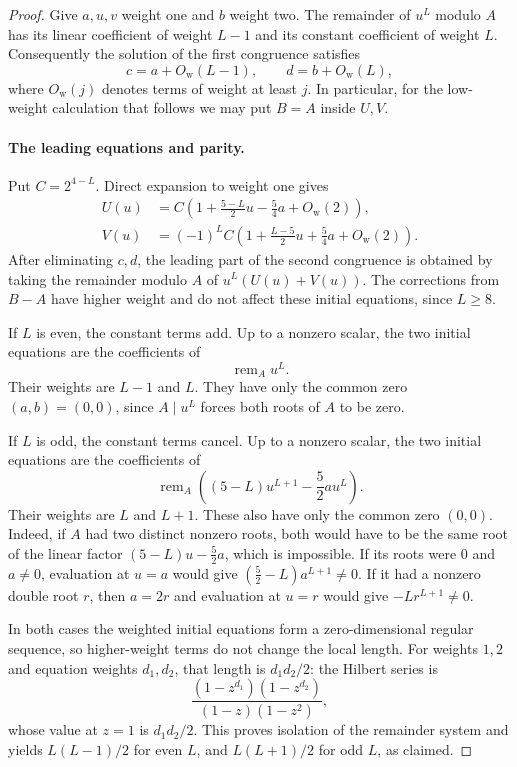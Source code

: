 \documentclass[11pt]{article}
\theoremstyle{definition}
\begin{document}
\begin{proof}
Give $a,u,v$ weight one and $b$ weight two. The remainder of $u^L$
modulo $A$ has its linear coefficient of weight $L-1$ and its constant
coefficient of weight $L$. Consequently the solution of the first
congruence satisfies
\[
 c=a+O_{\mathrm w}(L-1),\qquad d=b+O_{\mathrm w}(L),
\]
where $O_{\mathrm w}(j)$ denotes terms of weight at least $j$.
In particular, for the low-weight calculation that follows we may put
$B=A$ inside $U,V$.

\paragraph{The leading equations and parity.}
Put $C=2^{4-L}$. Direct expansion to weight one gives
\[
 \begin{aligned}
 U(u)&=C\left(1+\frac{5-L}{2}u-\frac54a+O_{\mathrm w}(2)\right),\\
 V(u)&=(-1)^LC\left(1+\frac{L-5}{2}u+\frac54a
                    +O_{\mathrm w}(2)\right).
 \end{aligned}
\]
After eliminating $c,d$, the leading part of the second congruence is
obtained by taking the remainder modulo $A$ of $u^L(U(u)+V(u))$.
The corrections from $B-A$ have higher weight and do not affect these
initial equations, since $L\ge8$.

If $L$ is even, the constant terms add. Up to a nonzero scalar, the
two initial equations are the coefficients of
\[
 \operatorname{rem}_A u^L.
\]
Their weights are $L-1$ and $L$. They have only the common zero
$(a,b)=(0,0)$, since $A\mid u^L$ forces both roots of $A$ to be zero.

If $L$ is odd, the constant terms cancel. Up to a nonzero scalar, the
two initial equations are the coefficients of
\[
 \operatorname{rem}_A\left((5-L)u^{L+1}-\frac52a u^L\right).
\]
Their weights are $L$ and $L+1$. These also have only the common zero
$(0,0)$. Indeed, if $A$ had two distinct nonzero roots, both would have
to be the same root of the linear factor
$(5-L)u-\tfrac52a$, which is impossible. If its roots were $0$ and
$a\ne0$, evaluation at $u=a$ would give
$(\tfrac52-L)a^{L+1}\ne0$. If it had a nonzero double root $r$, then
$a=2r$ and evaluation at $u=r$ would give $-Lr^{L+1}\ne0$.

In both cases the weighted initial equations form a zero-dimensional
regular sequence, so higher-weight terms do not change the local length.
For weights $1,2$ and equation weights $d_1,d_2$, that length is
$d_1d_2/2$: the Hilbert series is
\[
 \frac{(1-z^{d_1})(1-z^{d_2})}{(1-z)(1-z^2)},
\]
whose value at $z=1$ is $d_1d_2/2$. This proves isolation of the remainder
system and yields $L(L-1)/2$ for even $L$, and $L(L+1)/2$ for odd $L$,
as claimed.

\end{proof}
\end{document}
